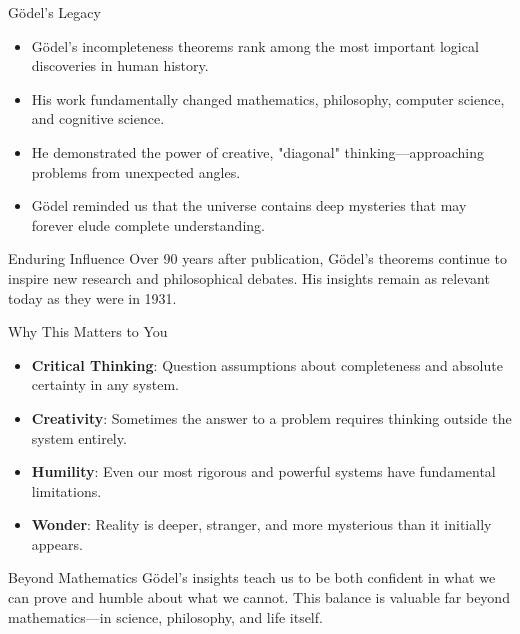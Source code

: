 \documentclass[aspectratio=169]{beamer}
\begin{document}
\begin{frame}{Gödel's Legacy}

\begin{itemize}
    \item Gödel's incompleteness theorems rank among the most important logical discoveries in human history.
    \item His work fundamentally changed mathematics, philosophy, computer science, and cognitive science.
    \item He demonstrated the power of creative, "diagonal" thinking—approaching problems from unexpected angles.
    \item Gödel reminded us that the universe contains deep mysteries that may forever elude complete understanding.
\end{itemize}

\begin{alertblock}{Enduring Influence}
Over 90 years after publication, Gödel's theorems continue to inspire new research and philosophical debates. His insights remain as relevant today as they were in 1931.
\end{alertblock}

\end{frame}

\begin{frame}{Why This Matters to You}

\begin{itemize}
    \item \textbf{Critical Thinking}: Question assumptions about completeness and absolute certainty in any system.
    \item \textbf{Creativity}: Sometimes the answer to a problem requires thinking outside the system entirely.
    \item \textbf{Humility}: Even our most rigorous and powerful systems have fundamental limitations.
    \item \textbf{Wonder}: Reality is deeper, stranger, and more mysterious than it initially appears.
\end{itemize}

\begin{block}{Beyond Mathematics}
Gödel's insights teach us to be both confident in what we can prove and humble about what we cannot. This balance is valuable far beyond mathematics—in science, philosophy, and life itself.
\end{block}

\end{frame}
\end{document}
